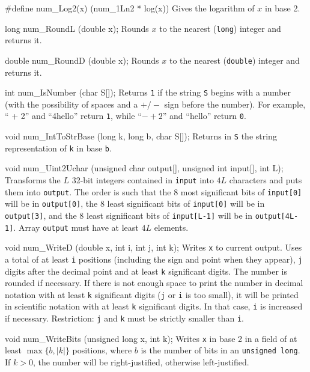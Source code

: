 #define num_Log2(x) (num_1Ln2 * log(x)) 
\endcode
  \tab Gives the logarithm of $x$ in base 2.
  \endtab
\code


long num_RoundL (double x);
\endcode
  \tab Rounds $x$ to the nearest ({\tt long}) integer and returns it.
  \endtab
\code


double num_RoundD (double x);
\endcode
  \tab Rounds $x$ to the nearest ({\tt double}) integer and returns it.
  \endtab
\code


int num_IsNumber (char S[]);
\endcode 
\tab  Returns {\tt 1} if the string {\tt S} begins with a number     
   (with the possibility of spaces and a $+/-$ sign    
   before the number). For example, `` + 2'' and ``4hello''
   return {\tt 1}, while ``$-+2$'' and ``hello'' return
   {\tt 0}.
\endtab
\code


void num_IntToStrBase (long k, long b, char S[]);
\endcode
  \tab Returns in {\tt S} the string representation of {\tt k} in base
  {\tt b}.
  \endtab
\code


void num_Uint2Uchar (unsigned char output[], unsigned int input[], int L);
\endcode
  \tab Transforms the $L$ 32-bit integers contained in {\tt input} into
   $4L$ characters and puts them into {\tt output}. The order is such that 
  the 8 most significant bits of {\tt input[0]} will be in {\tt output[0]},
  the 8 least significant bits of {\tt input[0]} will be in {\tt output[3]},
  and the 8 least significant bits of {\tt input[L-1]} will be in
   {\tt output[4L-1]}. Array {\tt output} must have at least $4L$ elements.
  \endtab
\code


void num_WriteD (double x, int i, int j, int k);
\endcode
  \tab  Writes {\tt x} to current output.  Uses a total of at least {\tt i}
   positions (including the sign and point when they appear),
   {\tt j} digits after the decimal point and at least {\tt k}
   significant digits.   The number is rounded if necessary.
   If there is not enough space to print the number in decimal notation
   with at least {\tt k} significant digits
   ({\tt j} or {\tt i} is too small), it will be printed in scientific
   notation with at least {\tt k} significant digits.
   In that case, {\tt i} is increased if necessary. 
   Restriction: {\tt j} and {\tt k} must be strictly smaller than {\tt i}.
 \endtab
\code


void num_WriteBits (unsigned long x, int k);
\endcode
 \tab Writes {\tt x} in base 2 in a field of at least
  $\max\{b, |k|\}$ positions, where $b$ is the number of bits in an
  {\tt unsigned long}.
  If $k>0$, the number will be right-justified, otherwise left-justified.
 \endtab
\code



